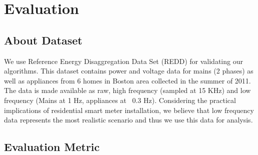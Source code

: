 \documentclass[conference]{IEEEtran}
\newcommand{\figref}[1]{Figure~\ref{#1}}
\begin{document}
\section{Evaluation}
\subsection{About Dataset}

We use Reference Energy Disaggregation Data Set (REDD) \cite{redd} for validating our algorithms. This dataset contains power and voltage data for mains (2 phases) as well as appliances from 6 homes in Boston area collected in the summer of 2011. The data is made available as raw, high frequency (sampled at 15 KHz) and low frequency (Mains at 1 Hz, appliances at ~0.3 Hz). Considering the practical implications of residential smart meter installation, we believe that low frequency data represents the most realistic scenario and thus we use this data for analysis. 



%	
%
\subsection{Evaluation Metric}
\end{document}
